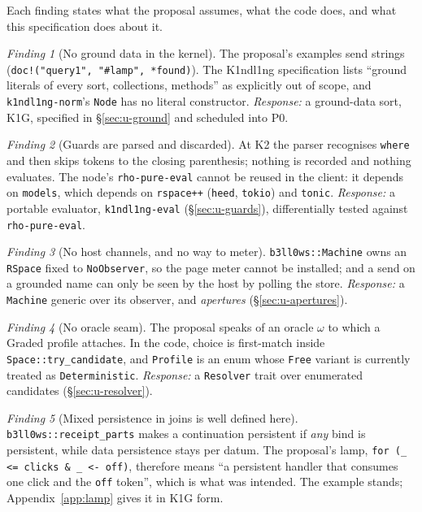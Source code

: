\documentclass[11pt]{article}
\theoremstyle{definition}
\theoremstyle{remark}
\newcommand{\Kind}{K1ndl1ng}
\newcommand{\code}[1]{\texttt{#1}}
\newtheorem{finding}{Finding}
\begin{document}
Each finding states what the proposal assumes, what the code does, and what this
specification does about it.

\begin{finding}[No ground data in the kernel]\label{f:ground}
The proposal's examples send strings (\code{doc!("query1", "\#lamp", *found)}). The
\Kind{} specification lists ``ground literals of every sort, collections, methods''
as explicitly out of scope, and \code{k1ndl1ng-norm}'s \code{Node} has no literal
constructor. \emph{Response:} a ground-data sort, K1G, specified in
\S\ref{sec:u-ground} and scheduled into P0.
\end{finding}

\begin{finding}[Guards are parsed and discarded]\label{f:guards}
At K2 the parser recognises \code{where} and then skips tokens to the closing
parenthesis; nothing is recorded and nothing evaluates. The node's
\code{rho-pure-eval} cannot be reused in the client: it depends on \code{models},
which depends on \code{rspace++} (\code{heed}, \code{tokio}) and \code{tonic}.
\emph{Response:} a portable evaluator, \code{k1ndl1ng-eval}
(\S\ref{sec:u-guards}), differentially tested against \code{rho-pure-eval}.
\end{finding}

\begin{finding}[No host channels, and no way to meter]\label{f:apertures}
\code{b3ll0ws::Machine} owns an \code{RSpace} fixed to \code{NoObserver}, so the
page meter cannot be installed; and a send on a grounded name can only be seen by
the host by polling the store. \emph{Response:} a \code{Machine} generic over its
observer, and \emph{apertures} (\S\ref{sec:u-apertures}).
\end{finding}

\begin{finding}[No oracle seam]\label{f:oracle}
The proposal speaks of an oracle $\omega$ to which a Graded profile attaches. In the
code, choice is first-match inside \code{Space::try\_candidate}, and \code{Profile}
is an enum whose \code{Free} variant is currently treated as \code{Deterministic}.
\emph{Response:} a \code{Resolver} trait over enumerated candidates
(\S\ref{sec:u-resolver}).
\end{finding}

\begin{finding}[Mixed persistence in joins is well defined here]
\code{b3ll0ws::receipt\_parts} makes a continuation persistent if \emph{any} bind is
persistent, while data persistence stays per datum. The proposal's lamp,
\code{for (\_ <= clicks \& \_ <- off)}, therefore means ``a persistent handler that
consumes one click and the \code{off} token'', which is what was intended. The
example stands; Appendix~\ref{app:lamp} gives it in K1G form.
\end{finding}
\end{document}
